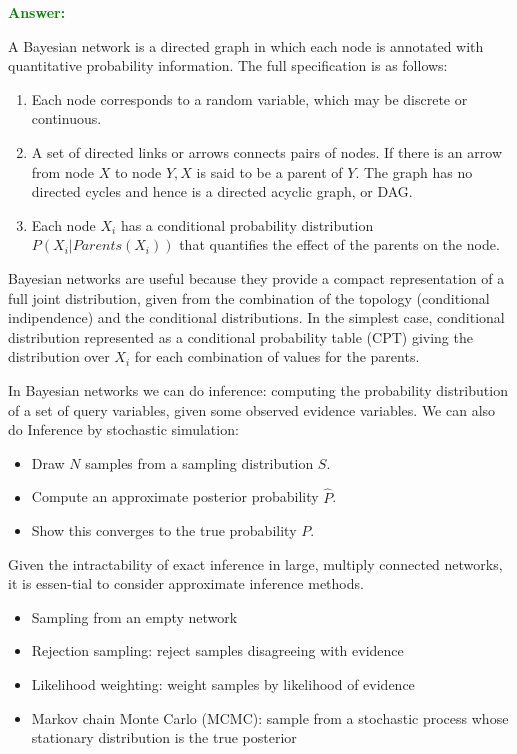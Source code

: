 \documentclass[12pt]{article}
\begin{document}
\begin{enumerate}[label=\textbf{U.\arabic*}]
    \textcolor{green}{\textbf{Answer:}}

    A Bayesian network is a directed graph in which each node is annotated with quantitative probability information. 
    The full specification is as follows:
    \begin{enumerate}
        \item Each node corresponds to a random variable, which may be discrete or continuous.
        \item A set of directed links or arrows connects pairs of nodes. 
        If there is an arrow from node $X$ to node $Y,X$ is said to be a parent of $Y$.
        The graph has no directed cycles and hence is a directed acyclic graph, or DAG.
        \item Each node $X_i$ has a conditional probability distribution $P(X_i|Parents(X_i))$ that quantifies the effect of the parents on the node.
    \end{enumerate}

    Bayesian networks are useful because they provide a compact representation of a full joint distribution, 
    given from the combination of the topology (conditional indipendence) and the conditional distributions.
    In the simplest case, conditional distribution represented as a conditional probability table (CPT) giving the distribution over $X_i$ for each combination of values for the parents.

    In Bayesian networks we can do inference: computing the probability distribution of a set of query variables, given some observed evidence variables.
    We can also do Inference by stochastic simulation:
    \begin{itemize}
        \item Draw $N$ samples from a sampling distribution $S$.
        \item Compute an approximate posterior probability $\hat{P}$.
        \item Show this converges to the true probability $P$.
    \end{itemize}

    Given the intractability of exact inference in large, multiply connected networks, it is essen-tial to consider approximate inference methods.
    \begin{itemize}
        \item Sampling from an empty network
        \item Rejection sampling: reject samples disagreeing with evidence
        \item Likelihood weighting: weight samples by likelihood of evidence
        \item Markov chain Monte Carlo (MCMC): sample from a stochastic process whose stationary distribution is the true posterior
    \end{itemize}


\end{enumerate}
\end{document}

